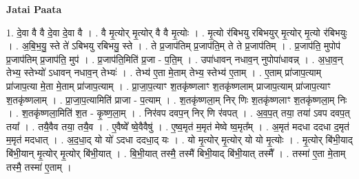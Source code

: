 \documentclass[17pt]{extarticle}
\begin{document}
\textbf{Jatai Paata} \newline

1. दे॒वा वै वै दे॒वा दे॒वा वै । . वै मृ॒त्योर् मृ॒त्योर् वै वै मृ॒त्योः । . मृ॒त्यो र॑बिभयु रबिभयुर् मृ॒त्योर् मृ॒त्यो र॑बिभयुः । . अ॒बि॒भ॒यु॒ स्ते ते॑ ऽबिभयु रबिभयु॒ स्ते । . ते प्र॒जाप॑तिम् प्र॒जाप॑ति॒म् ते ते प्र॒जाप॑तिम् । . प्र॒जाप॑ति॒ मुपोप॑ प्र॒जाप॑तिम् प्र॒जाप॑ति॒ मुप॑ । . प्र॒जाप॑ति॒मिति॑ प्र॒जा - प॒ति॒म् । . उपा॑धावन् नधाव॒न् नुपोपा॑धावन्न् । . अ॒धा॒व॒न् तेभ्य॒ स्तेभ्यो॑ ऽधावन् नधाव॒न् तेभ्यः॑ । . तेभ्य॑ ए॒ता मे॒ताम् तेभ्य॒ स्तेभ्य॑ ए॒ताम् । . ए॒ताम् प्रा॑जाप॒त्याम् प्रा॑जाप॒त्या मे॒ता मे॒ताम् प्रा॑जाप॒त्याम् । . प्रा॒जा॒प॒त्याꣳ श॒तकृ॑ष्णलाꣳ श॒तकृ॑ष्णलाम् प्राजाप॒त्याम् प्रा॑जाप॒त्याꣳ श॒तकृ॑ष्णलाम् । . प्रा॒जा॒प॒त्यामिति॑ प्राजा - प॒त्याम् । . श॒तकृ॑ष्णला॒म् निर् णिः श॒तकृ॑ष्णलाꣳ श॒तकृ॑ष्णला॒म् निः । . श॒तकृ॑ष्णला॒मिति॑ श॒त - कृ॒ष्ण॒ला॒म् । . निर॑वप दवप॒न् निर् णि र॑वपत् । . अ॒व॒प॒त् तया॒ तया॑ ऽवप दवप॒त् तया᳚ । . तयै॒वैव तया॒ तयै॒व । . ए॒वैष्वे᳚ ष्वे॒वैवैषु॑ । . ए॒ष्व॒मृत॑ म॒मृत॑ मेष्वे ष्व॒मृत᳚म् । . अ॒मृत॑ मदधा ददधा द॒मृत॑ म॒मृत॑ मदधात् । . अ॒द॒धा॒द् यो यो॑ ऽदधा ददधा॒द् यः । . यो मृ॒त्योर् मृ॒त्योर् यो यो मृ॒त्योः । . मृ॒त्योर् बि॑भी॒याद् बि॑भी॒यान् मृ॒त्योर् मृ॒त्योर् बि॑भी॒यात् । . बि॒भी॒यात् तस्मै॒ तस्मै॑ बिभी॒याद् बि॑भी॒यात् तस्मै᳚ । . तस्मा॑ ए॒ता मे॒ताम् तस्मै॒ तस्मा॑ ए॒ताम् । \newline
\end{document}
